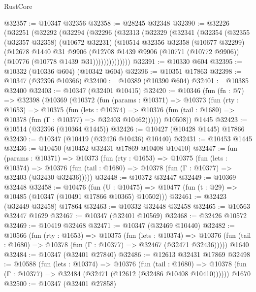 \begin{lexlean}{RustCore}
\begin{coremodule}
@32357 := @10347 @32356
@32358 := @28245 @32348
@32390 := @32226
    (@32251
      (@32292
        (@32294
          (@32296
            (@32313
              (@32329
                (@32341
                  (@32354
                    (@32355
                      (@32357 @32358)
                      (@10672 @32231)
                      (@10514
                        @32356
                        @32358
                        (@10677 @32299)
                        (@12678
                          @1440
                          @31
                          @9906
                          (@12708
                            @1439
                            @9906
                            (@10771 (@10772 @9906))
                            (@10776 (@10778 @1439 @31))))))))))))))
@32391 := @10330 @604
@32395 := @10332 (@10336 @604) (@10342 @604)
@32396 := @10351 @17863
@32398 := @10347 (@32396 @10366)
@32400 := @10389 (@10390 @604)
@32401 := @10385 @32400
@32403 := @10347 (@32401 @10415)
@32420 := @10346
    (fun (fn : @7) =>
    @32398
      (@10369
        (@10372
          (fun (params : @10371) =>
          @10373
            (fun (rty : @1653) =>
            @10375
              (fun (lets : @10374) =>
              @10376 (fun (tail : @1680) => @10378 (fun (Γ : @10377) => @32403 @10462))))))
        @10508))
    @1445
@32423 := @10514 (@32396 (@10364 @1445))
@32426 := @10427 (@10428 @1445) @17866
@32430 := @10347 (@10419 (@32426 @10436) @10440)
@32431 := @10453 @1445
@32436 := @10450 (@10452 @32431 @17869 @10408 @10410)
@32447 := fun (params : @10371) =>
  @10373
    (fun (rty : @1653) =>
    @10375
      (fun (lets : @10374) =>
      @10376 (fun (tail : @1680) => @10378 (fun (Γ : @10377) => @32403 (@32430 @32436)))))
@32448 := @10372 @32447
@32449 := @10369 @32448
@32458 := @10476
    (fun (U : @10475) => @10477 (fun (t : @29) => @10485 (@10347 (@10491 @17866 @10365) @10502)))
@32461 := @32423 (@32449 @32458) @17864
@32463 := @10332 @32448 @32458
@32465 := @10563 @32447 @1629
@32467 := @10347 (@32401 @10569)
@32468 := @32426 @10572
@32469 := @10419 @32468
@32471 := @10347 (@32469 @10440)
@32482 := @10566
    (fun (rty : @1653) =>
    @10375
      (fun (lets : @10374) =>
      @10376 (fun (tail : @1680) => @10378 (fun (Γ : @10377) => @32467 (@32471 @32436)))))
    @1640
@32484 := @10347 (@32401 @27840)
@32486 := @12613 @32431 @17869
@32498 := @10588
    (fun (lets : @10374) =>
    @10376
      (fun (tail : @1680) =>
      @10378 (fun (Γ : @10377) => @32484 (@32471 (@12612 (@32486 @10408 @10410))))))
    @1670
@32500 := @10347 (@32401 @27858)

\end{coremodule}
\end{lexlean}
